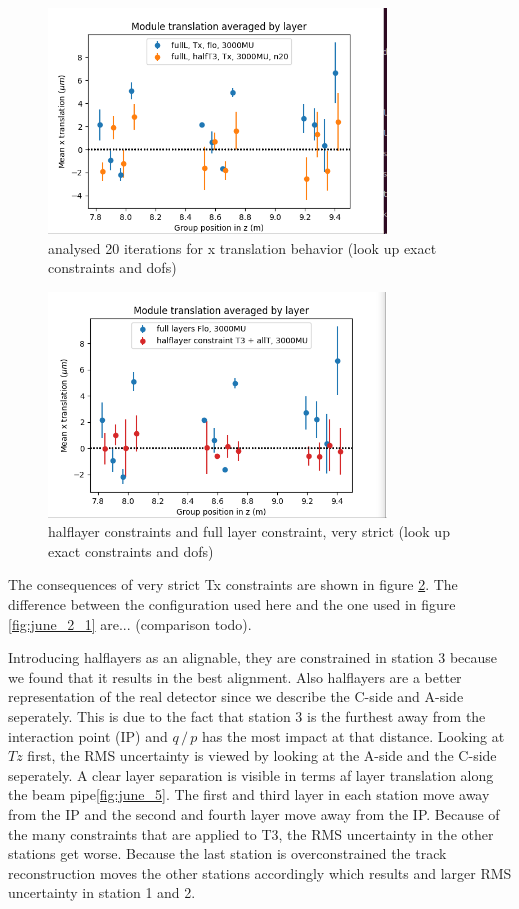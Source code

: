 \begin{figure}
  \centering
  \includegraphics[width=0.8\textwidth]{plots/june_21/allT_halfT3_n20_Tx.png}
  \caption{analysed 20 iterations for x translation behavior (look up exact constraints and dofs)}
  \label{fig:june_3}
\end{figure}

\begin{figure}
  \centering
  \includegraphics[width=0.8\textwidth]{plots/june_21/allT_halfT3_Tx_vs_Flo.png}
  \caption{halflayer constraints and full layer constraint, very strict (look up exact constraints and dofs)}
  \label{fig:june_4}
\end{figure}

The consequences of very strict Tx constraints are shown in figure \ref{fig:june_4}.
The difference between the configuration used here and the one used in figure
\ref{fig:june_2_1} are... (comparison todo).

Introducing halflayers as an alignable, they are constrained in station 3 because
we found that it results in the best alignment.
Also halflayers are a better representation of the real detector since we describe
the C-side and A-side seperately.
This is due to the fact that station 3 is the furthest away from the interaction point (IP) and $q \,/\, p$ has the most impact at that distance.
Looking at $Tz$ first, the RMS uncertainty is viewed by looking at the A-side and the C-side seperately.
A clear layer separation is visible in terms af layer translation along the beam pipe\ref{fig:june_5}.
The first and third layer in each station move away from the IP and the second and
fourth layer move away from the IP.
Because of the many constraints that are applied to T3, the RMS uncertainty in the other stations get worse. Because the last station is overconstrained the track reconstruction moves the other stations accordingly which results and larger RMS uncertainty in station 1 and 2.

